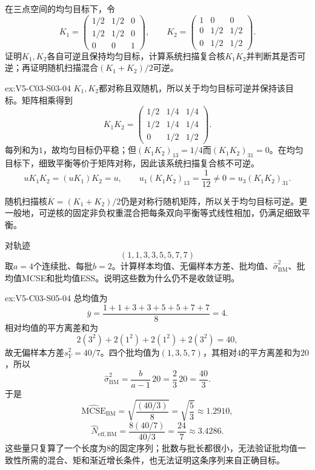 \begin{SLChapterExercisePairSection}
\begin{exercise}\label{ex:V5-C03-S03-04}
在三点空间的均匀目标下，令
\[
K_1=\begin{pmatrix}
1/2&1/2&0\\1/2&1/2&0\\0&0&1
\end{pmatrix},
\qquad
K_2=\begin{pmatrix}
1&0&0\\0&1/2&1/2\\0&1/2&1/2
\end{pmatrix}.
\]
证明$K_1,K_2$各自可逆且保持均匀目标，计算系统扫描复合核$K_1K_2$并判断其是否可逆；再证明随机扫描混合$(K_1+K_2)/2$可逆。
\end{exercise}
\ifSLFullEdition
{}\label{sol:V5-C03-S03-04}
\begin{chapterexercisesolution}{ex:V5-C03-S03-04}
$K_1,K_2$都对称且双随机，所以关于均匀目标可逆并保持该目标。矩阵相乘得到
\[
K_1K_2
=\begin{pmatrix}
1/2&1/4&1/4\\
1/2&1/4&1/4\\
0&1/2&1/2
\end{pmatrix}.
\]
每列和为$1$，故均匀目标仍平稳；但$(K_1K_2)_{13}=1/4$而$(K_1K_2)_{31}=0$。在均匀目标下，细致平衡等价于矩阵对称，因此该系统扫描复合核不可逆。
\[
uK_1K_2=(uK_1)K_2=u,\qquad
u_1(K_1K_2)_{13}=\frac1{12}\ne0=u_3(K_1K_2)_{31}.
\]

随机扫描核$\overline K=(K_1+K_2)/2$仍是对称行随机矩阵，所以关于均匀目标可逆。更一般地，可逆核的固定非负权重混合把每条双向平衡等式线性相加，仍满足细致平衡。
\end{chapterexercisesolution}
\fi

\begin{exercise}\label{ex:V5-C03-S05-04}
对轨迹
\[
(1,1,3,3,5,5,7,7)
\]
取$a=4$个连续批、每批$b=2$。计算样本均值、无偏样本方差、批均值、$\widehat\sigma_{\mathrm{BM}}^2$、批均值MCSE和批均值ESS。说明这些数为什么仍不是收敛证明。
\end{exercise}
\ifSLFullEdition
{}\label{sol:V5-C03-S05-04}
\begin{chapterexercisesolution}{ex:V5-C03-S05-04}
总均值为
\[
\bar y=\frac{1+1+3+3+5+5+7+7}{8}=4.
\]
相对均值的平方离差和为
\[
2(3^2)+2(1^2)+2(1^2)+2(3^2)=40,
\]
故无偏样本方差$s_Y^2=40/7$。四个批均值为$(1,3,5,7)$，其相对$4$的平方离差和为$20$，所以
\[
\widehat\sigma_{\mathrm{BM}}^2
=\frac{b}{a-1}\,20
=\frac{2}{3}\,20
=\frac{40}{3}.
\]
于是
\[
\widehat{\mathrm{MCSE}}_{\mathrm{BM}}
=\sqrt{\frac{(40/3)}8}
=\sqrt{\frac53}\approx1.2910,
\]
\[
\widehat N_{\mathrm{eff,BM}}
=\frac{8(40/7)}{40/3}
=\frac{24}{7}\approx3.4286.
\]
这些量只复算了一个长度为$8$的固定序列；批数与批长都很小，无法验证批均值一致性所需的混合、矩和渐近增长条件，也无法证明这条序列来自正确目标。
\end{chapterexercisesolution}
\fi


\end{SLChapterExercisePairSection}
